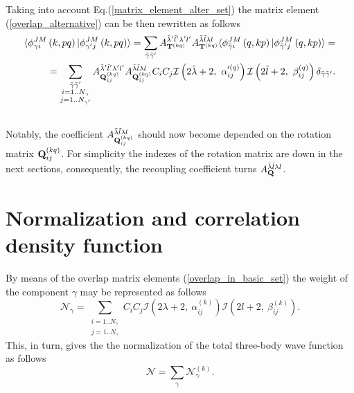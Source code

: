 \documentclass[
12pt, %
oneside, %
english, %
onehalfspacing, %
onehalfspacing, %
headsepline, %
]{MastersDoctoralThesis} %
\begin{document}
Taking into account Eq.(\ref{matrix_element_alter_set}) the matrix element (\ref{overlap_alternative}) can be then rewritten  as follows
\begin{align}
\langle \phi^{ J M}_{\gamma i}\left(k,pq \right) \vert 
\phi^{ J M}_{\gamma^{\prime}j}\left(k,pq \right) \rangle
= \label{overlap_to_q}
\sum_{\tilde{\gamma} \tilde{\gamma}'}
A^{\tilde{\lambda}' \tilde{l}' \lambda' l'}_{{\bf T}^{(kq)} }
A^{\tilde{\lambda} \tilde{l} \lambda l}_{{\bf T}^{(kq)} }
\langle \phi^{ J M}_{\tilde{\gamma} i}\left(q,kp \right) \vert 
\phi^{ J M}_{\tilde{\gamma}^{\prime}j}\left(q,kp \right) \rangle= 
 \nonumber  \\
=
\sum_{\substack{\tilde{\gamma} \tilde{\gamma}'\\i=1..N_\gamma \\j=1..N_{\gamma'}}}
A^{\tilde{\lambda}' \tilde{l}' \lambda' l'}_{{\bf Q}^{(kq)}_{ij} }
A^{\tilde{\lambda} \tilde{l} \lambda l}_{{\bf Q}^{(kq)}_{ij} }
 C_i C_j
 \mathcal{I} \left( 2 \tilde{\lambda}+2,~
\alpha'^{(q)}_{ij}
  \right)
\mathcal{I} \left( 2 \tilde{l}+2, ~
\beta_{ij}^{(q)} \right)
  \delta_{\tilde{\gamma}\tilde{\gamma}^{\prime}}.  \nonumber \\
  {}
\end{align}
Notably, the coefficient $A^{\tilde{\lambda} \tilde{l} \lambda l}_{ \tiny {\bf Q}^{(kq)}_{ij} }$ should now become depended on the rotation matrix ${\bf Q}^{(kq)}_{ij}$. For simplicity the indexes of the rotation matrix are down in the next sections, consequently, the recoupling coefficient turns $A^{\tilde{\lambda} \tilde{l} \lambda l}_{  {\bf Q} }$.


\section{Normalization and correlation density function}
By means of the overlap matrix elements (\ref{overlap_in_basic_set})  the weight of the component $\gamma$ may be represented as follows
\begin{equation}
\mathcal{N}_{\gamma} =  
\sum_{\substack{i=1..N_\gamma \\j=1..N_{\gamma}}} 
C_i C_j 
 \mathcal{I} \left( 2\lambda+2,~\alpha_{ij}^{(k)} \right)
 \mathcal{I} \left( 2l+2,~\beta_{ij}^{(k)} \right).
\end{equation}
This, in turn, gives the the normalization of the total three-body wave function as follows
\begin{equation}
\mathcal{N}  = \sum_{\gamma} \mathcal{N}^{(k)}_{\gamma}.    
\end{equation}
\end{document}
